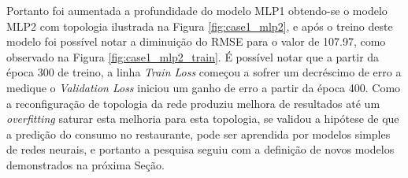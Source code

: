         Portanto foi aumentada a profundidade do modelo MLP1 obtendo-se o modelo MLP2 com topologia ilustrada na Figura  \ref{fig:case1_mlp2}, e após o treino deste modelo foi possível notar a diminuição do RMSE para o valor de 107.97, como observado na Figura \ref{fig:case1_mlp2_train}. É possível notar que a partir da época 300 de treino, a linha \textit{Train Loss} começou a sofrer um decréscimo de erro a medique o \textit{Validation Loss} iniciou um ganho de erro a partir da época 400. Como a reconfiguração de topologia da rede produziu melhora de resultados até um \textit{overfitting} saturar esta melhoria para esta topologia, se validou a hipótese de que a predição do consumo no restaurante, pode ser aprendida por modelos simples de redes neurais, e portanto a pesquisa seguiu com a definição de novos modelos demonstrados na próxima Seção.
        \begin{figure}[H]
        \end{figure}
